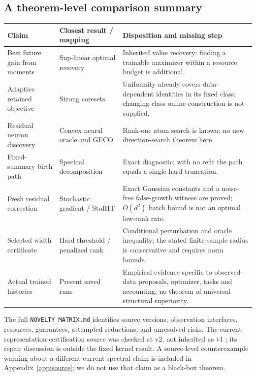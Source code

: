 \documentclass[11pt]{article}
\theoremstyle{remark}\newtheorem{remark}[theorem]{Remark}
\begin{document}
\subsection{A theorem-level comparison summary}
\begin{longtable}{>{\raggedright\arraybackslash}p{.14\linewidth}>{\raggedright\arraybackslash}p{.30\linewidth}>{\raggedright\arraybackslash}p{.45\linewidth}}
\toprule
Claim & Closest result / mapping & Disposition and missing step\\\midrule
\endhead
Best future gain from moments & Sup-linear optimal recovery \cite{foucart} &
Inherited value recovery; finding a trainable maximizer within a resource
budget is additional.\\
Adaptive retained objective & Strong coresets \cite{coresets} &
Uniformity already covers data-dependent identities in its fixed class;
changing-class online construction is not supplied.\\
Residual neuron discovery & Convex neural oracle and GECO \cite{bach,geco} &
Rank-one atom search is known; no new direction-search theorem here.\\
Fixed-summary birth path & Spectral decomposition & Exact diagnostic;
with no refit the path equals a single hard truncation.\\
Fresh residual correction & Stochastic gradient / StoIHT \cite{stoiht} &
Exact Gaussian constants and a noise-free false-growth witness are proved;
$O(d^2)$ batch bound is not an optimal low-rank rate.\\
Selected width certificate & Hard threshold / penalized rank &
Conditional perturbation and oracle inequality; the stated finite-sample
radius is conservative and requires norm bounds.\\
Actual trained histories & Present saved runs & Empirical evidence specific
to observed-data proposals, optimizer, tasks and accounting; no theorem of
universal structural superiority.\\\bottomrule
\end{longtable}

The full \texttt{NOVELTY\_MATRIX.md} identifies source versions, observation
interfaces, resources, guarantees, attempted reductions, and unresolved
risks. The current representation-certification source was checked at v2,
not inherited as v1 \cite{huang}; its repair discussion is outside the fixed
kernel result. A source-level counterexample warning about a different
current spectral claim is included in Appendix~\ref{app:source}; we do not
use that claim as a black-box theorem.
\end{document}
